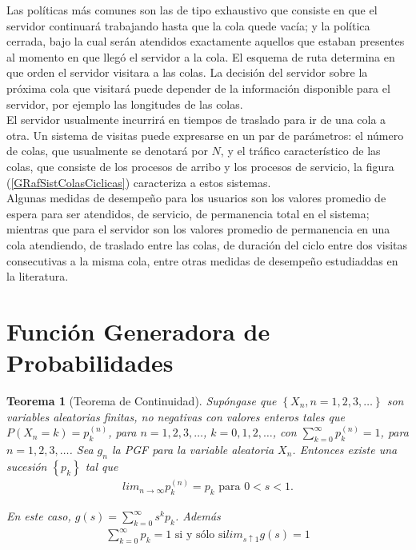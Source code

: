 \documentclass{article}
\newtheorem{Teo}{Teorema}
\begin{document}
Las pol\'iticas m\'as comunes son las de tipo exhaustivo que consiste en que el servidor continuar\'a trabajando hasta que la cola quede vac\'ia; y la pol\'itica cerrada, bajo la cual ser\'an atendidos exactamente aquellos que estaban presentes al momento en que lleg\'o el servidor a la cola. El esquema de ruta determina en que orden el servidor visitara a las colas. La decisi\'on del servidor sobre la pr\'oxima cola que visitar\'a puede depender de la informaci\'on disponible para el servidor, por ejemplo las longitudes de las
colas.\\

El servidor usualmente incurrir\'a en tiempos de traslado para ir de una cola a otra. Un sistema de visitas puede expresarse en un par de par\'ametros: el n\'umero de colas, que usualmente se denotar\'a por $N$, y el tr\'afico caracter\'istico de las colas, que consiste de los procesos de arribo y los procesos de servicio, la figura (\ref{GRafSistColasCiclicas}) caracteriza a estos sistemas.\\

Algunas medidas de desempe\~no para los usuarios son los valores promedio de espera para ser atendidos, de servicio, de permanencia total en el sistema; mientras que para el servidor son los valores promedio de permanencia en una cola atendiendo, de traslado entre las colas, de duraci\'on del ciclo entre dos visitas consecutivas a la misma cola, entre otras medidas de desempe\~no estudiaddas en la literatura.


%
 \section{Funci\'on Generadora de Probabilidades}

\begin{Teo}[Teorema de Continuidad]
Sup\'ongase que $\left\{X_{n},n=1,2,3,\ldots\right\}$ son variables aleatorias finitas, no negativas con valores enteros tales que $P\left(X_{n}=k\right)=p_{k}^{(n)}$, para $n=1,2,3,\ldots$, $k=0,1,2,\ldots$, con $\sum_{k=0}^{\infty}p_{k}^{(n)}=1$, para $n=1,2,3,\ldots$. Sea $g_{n}$ la PGF para la variable aleatoria $X_{n}$. Entonces existe una sucesi\'on $\left\{p_{k}\right\}$ tal que \begin{eqnarray*}
lim_{n\rightarrow\infty}p_{k}^{(n)}=p_{k}\textrm{ para }0<s<1.
\end{eqnarray*}

En este caso, $g\left(s\right)=\sum_{k=0}^{\infty}s^{k}p_{k}$. Adem\'as
\begin{eqnarray*}
\sum_{k=0}^{\infty}p_{k}=1\textrm{ si y s\'olo si
}lim_{s\uparrow1}g\left(s\right)=1
\end{eqnarray*}
\end{Teo}
\end{document}
